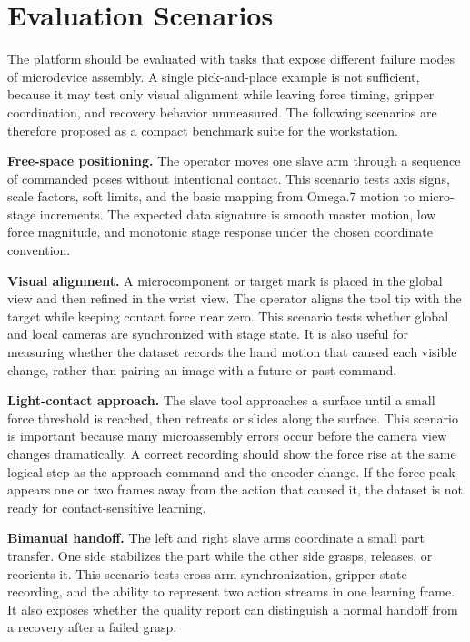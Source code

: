 \documentclass[10pt,twocolumn,letterpaper]{article}
\begin{document}
\section{Evaluation Scenarios}
The platform should be evaluated with tasks that expose different
failure modes of microdevice assembly. A single pick-and-place example
is not sufficient, because it may test only visual alignment while
leaving force timing, gripper coordination, and recovery behavior
unmeasured. The following scenarios are therefore proposed as a compact
benchmark suite for the workstation.

\textbf{Free-space positioning.} The operator moves one slave arm through
a sequence of commanded poses without intentional contact. This scenario
tests axis signs, scale factors, soft limits, and the basic mapping from
Omega.7 motion to micro-stage increments. The expected data signature is
smooth master motion, low force magnitude, and monotonic stage response
under the chosen coordinate convention.

\textbf{Visual alignment.} A microcomponent or target mark is placed in
the global view and then refined in the wrist view. The operator aligns
the tool tip with the target while keeping contact force near zero. This
scenario tests whether global and local cameras are synchronized with
stage state. It is also useful for measuring whether the dataset records
the hand motion that caused each visible change, rather than pairing an
image with a future or past command.

\textbf{Light-contact approach.} The slave tool approaches a surface
until a small force threshold is reached, then retreats or slides along
the surface. This scenario is important because many microassembly
errors occur before the camera view changes dramatically. A correct
recording should show the force rise at the same logical step as the
approach command and the encoder change. If the force peak appears one
or two frames away from the action that caused it, the dataset is not
ready for contact-sensitive learning.

\textbf{Bimanual handoff.} The left and right slave arms coordinate a
small part transfer. One side stabilizes the part while the other side
grasps, releases, or reorients it. This scenario tests cross-arm
synchronization, gripper-state recording, and the ability to represent
two action streams in one learning frame. It also exposes whether the
quality report can distinguish a normal handoff from a recovery after a
failed grasp.
\end{document}
